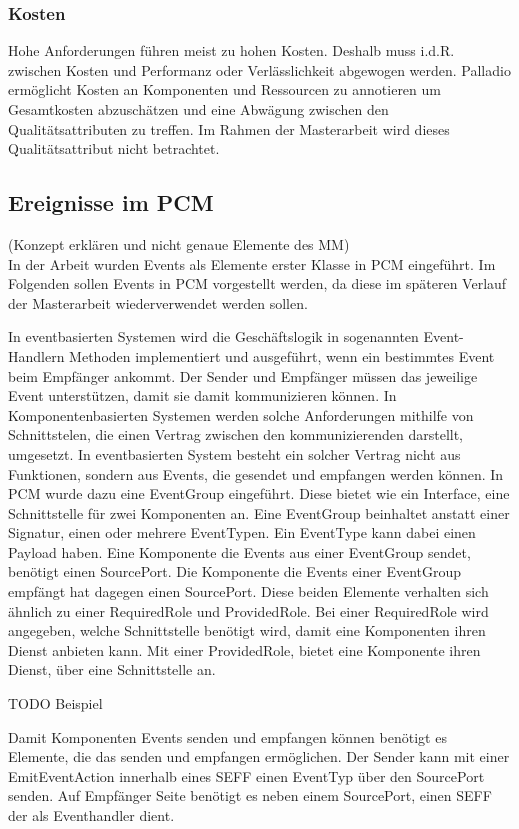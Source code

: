\subsubsection{Kosten}
Hohe Anforderungen führen meist zu hohen Kosten. Deshalb muss i.d.R. zwischen Kosten und Performanz oder Verlässlichkeit abgewogen werden. Palladio ermöglicht Kosten an Komponenten und Ressourcen zu annotieren um Gesamtkosten abzuschätzen und eine Abwägung zwischen den Qualitätsattributen zu treffen. Im Rahmen der Masterarbeit wird dieses Qualitätsattribut nicht betrachtet.

\subsection{Ereignisse im PCM}
(Konzept erklären und nicht genaue Elemente des MM) \\
In der Arbeit \cite{Rathfelder2013} wurden Events als Elemente erster Klasse in PCM eingeführt. Im Folgenden sollen Events in PCM vorgestellt werden, da diese im späteren Verlauf der Masterarbeit wiederverwendet werden sollen. \par
In eventbasierten Systemen wird die Geschäftslogik in sogenannten Event-Handlern  Methoden implementiert und ausgeführt, wenn ein bestimmtes Event beim Empfänger ankommt. Der Sender und Empfänger müssen das jeweilige Event unterstützen, damit sie damit kommunizieren können. In Komponentenbasierten Systemen werden solche Anforderungen mithilfe von Schnittstelen, die einen Vertrag zwischen den kommunizierenden darstellt, umgesetzt. In eventbasierten System besteht ein solcher Vertrag nicht aus Funktionen, sondern aus Events, die gesendet und empfangen werden können. In PCM wurde dazu eine EventGroup eingeführt. Diese bietet wie ein Interface, eine Schnittstelle für zwei Komponenten an. Eine EventGroup beinhaltet anstatt einer Signatur, einen oder mehrere EventTypen. Ein EventType kann dabei einen Payload haben. Eine Komponente die Events aus einer EventGroup sendet, benötigt einen SourcePort. Die Komponente die Events einer EventGroup empfängt hat dagegen einen SourcePort. Diese beiden Elemente verhalten sich ähnlich zu einer RequiredRole und ProvidedRole. Bei einer RequiredRole wird angegeben, welche Schnittstelle benötigt wird, damit eine Komponenten ihren Dienst anbieten kann. Mit einer ProvidedRole, bietet eine Komponente ihren Dienst, über eine Schnittstelle an. 

TODO Beispiel

Damit Komponenten Events senden und empfangen können benötigt es Elemente, die das senden und empfangen ermöglichen. Der Sender kann mit einer EmitEventAction innerhalb eines SEFF einen EventTyp über den SourcePort senden. Auf Empfänger Seite benötigt es neben einem SourcePort, einen SEFF der als Eventhandler dient.

